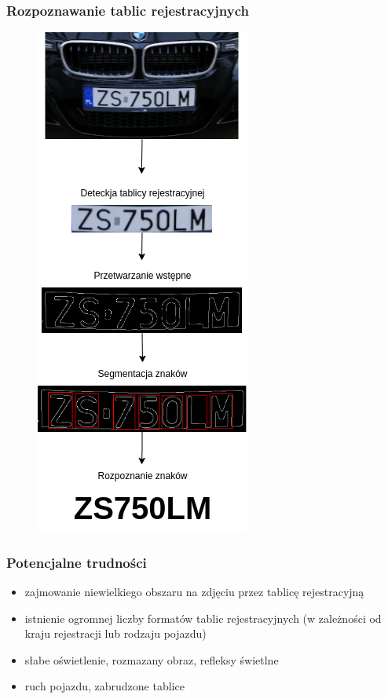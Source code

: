 \documentclass{beamer}
\begin{document}
    \begin{frame}
        \frametitle{Rozpoznawanie tablic rejestracyjnych}
        \begin{figure}
            \includegraphics[scale=0.3]{../WIZUT-Dyplom-styl/Pictures/schemat_lpr}
        \end{figure}
    \end{frame}

    \begin{frame}
        \frametitle{Potencjalne trudności}
        \begin{itemize}
            \item zajmowanie niewielkiego obszaru na zdjęciu przez tablicę rejestracyjną
            \item istnienie ogromnej liczby formatów tablic rejestracyjnych \linebreak (w zależności od kraju rejestracji lub rodzaju pojazdu)
            \item słabe oświetlenie, rozmazany obraz, refleksy świetlne
            \item ruch pojazdu, zabrudzone tablice
        \end{itemize}
    \end{frame}
\end{document}
